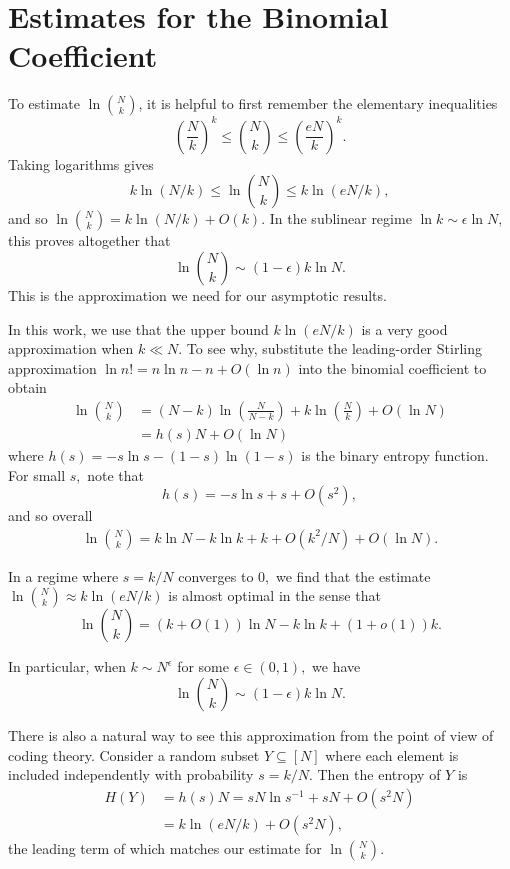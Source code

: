 \section{Estimates for the Binomial Coefficient \label{appendix:binomial}}
To estimate \(\ln \binom{N}{k}\), it is helpful to first remember the elementary inequalities
\[
	\left(\frac{N}{k}\right)^k \le \binom{N}{k} \le \left( \frac{e N}{k} \right)^k.
\]
Taking logarithms gives
\[
	k \ln (N/k) \le \ln \binom{N}{k} \le k \ln (eN/k),
\]
and so $\ln \binom{N}{k} = k \ln (N/k) + O(k).$ In the sublinear regime $\ln k \sim \epsilon \ln N,$ this proves altogether that
$$
\ln \binom N k \sim (1 - \epsilon) k \ln N.
$$
This is the approximation we need for our asymptotic results.

In this work, we use that the upper bound \(k \ln(eN/k)\) is a very good approximation when \(k \ll N\). To see why, substitute the leading-order Stirling approximation $\ln n! = n \ln n - n + O(\ln n)$ into the binomial coefficient to obtain
\begin{align*}
	\ln \binom{N}{k} & = (N - k) \ln\left( \frac{N}{N - k} \right) + k \ln\left( \frac{N}{k} \right) + O(\ln N) \\
	& = h(s) N + O(\ln N)
\end{align*}
where $h(s) = -s \ln s - (1 - s)\ln(1 - s)$ is the binary entropy function. For small $s,$ note that
$$
	h(s) = -s \ln s + s + O(s^2),
$$
and so overall
\begin{align*}
	\ln \binom N k = k \ln N - k \ln k + k + O(k^2/N) + O(\ln N).
\end{align*}

In a regime where $s = k/N$ converges to $0,$ we find that the estimate $\ln \binom N k \approx k \ln(eN/k)$ is almost optimal in the sense that
$$
	\ln \binom N k = (k + O(1)) \ln N - k \ln k + (1 + o(1)) k.
$$

In particular, when $k \sim N^\epsilon$ for some $\epsilon \in (0, 1),$ we have
$$
\ln \binom N k \sim (1 - \epsilon) k \ln N.
$$

There is also a natural way to see this approximation from the point of view of coding theory. Consider a random subset \(Y \subseteq [N]\) where each element is included independently with probability \(s = k/N\). Then the entropy of \(Y\) is
\begin{align*}
	H(Y) & = h(s) N = s N \ln s^{-1} + s N + O(s^2 N) \\
	     & = k \ln(e N/k) + O(s^2 N),
\end{align*}
the leading term of which matches our estimate for $\ln \binom N k.$
